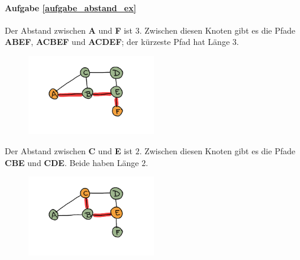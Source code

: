 \paragraph{Aufgabe \ref{aufgabe_abstand_ex}}
Der Abstand zwischen \textbf{A} und \textbf{F} ist \(3\). Zwischen diesen Knoten gibt es die Pfade \textbf{ABEF}, \textbf{ACBEF} und \textbf{ACDEF}; der kürzeste Pfad hat Länge \(3\).
\begin{figure}[H]
    \centering
    \includegraphics[width=0.5\textwidth]{Pictures/SP/abstand_ex-l1.png}
\end{figure}
Der Abstand zwischen \textbf{C} und \textbf{E} ist \(2\). Zwischen diesen Knoten gibt es die Pfade \textbf{CBE} und \textbf{CDE}. Beide haben Länge \(2\).
\begin{figure}[H]
    \centering
    \includegraphics[width=0.5\textwidth]{Pictures/SP/abstand_ex-l2.png}
\end{figure}

